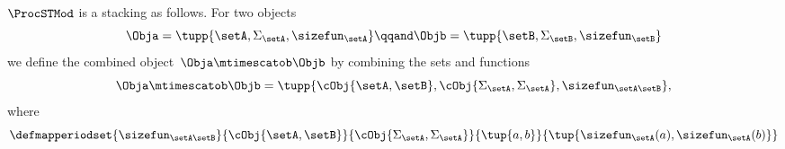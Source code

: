\begin{lemma}\label{lem:ProcSTMod-stacking}
    $\ProcSTMod$ is a stacking  as follows.
    For two objects
    \begin{equation}
        \Obja = \tupp{\setA, \Sigma_{\setA}, \sizefun_{\setA}}
        \qqand
        \Objb = \tupp{\setB, \Sigma_{\setB}, \sizefun_{\setB}}
    \end{equation}
    we define the combined object~$\Obja \mtimescatob \Objb$ by combining the sets and functions
    \begin{equation}
        \Obja \mtimescatob \Objb = \tupp{
            \cObj {\setA,\setB},
            \cObj {\Sigma_{\setA}, \Sigma_{\setA}},
            \sizefun_{\setA\setB}
        },
    \end{equation}
    where
    \begin{equation}
        \defmapperiodset{
            \sizefun_{\setA\setB}
        }{
            \cObj {\setA, \setB}
        }{
            \cObj {\Sigma_{\setA}, \Sigma_{\setA}}
        }{
            \tup{a,b}
        }{
            \tup{
                \sizefun_{\setA}(a),
                \sizefun_{\setA}(b)
            }
        }
    \end{equation}


\end{lemma}
